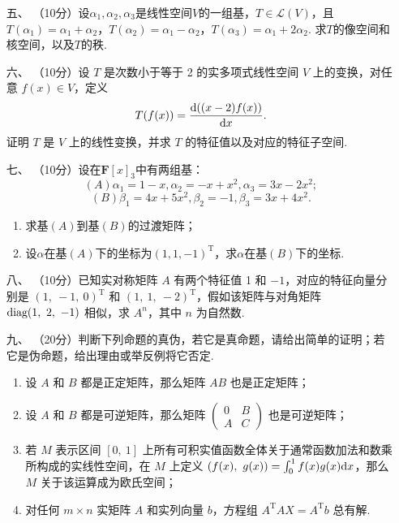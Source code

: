 \begin{enumerate}
	\item[五、]（10分）设$\alpha_1,\alpha_2,\alpha_3$是线性空间$V$的一组基，$T\in\mathcal{L}(V)$，且$T(\alpha_1)=\alpha_1+\alpha_2$，$T(\alpha_2)=\alpha_1-\alpha_2$，$T(\alpha_3)=\alpha_1+2\alpha_2$. 求$T$的像空间和核空间，以及$T$的秩.
	\item[六、]（10分）设 $T$ 是次数小于等于 2 的实多项式线性空间 $V$ 上的变换，对任意 $f(x) \in V$，定义
    \[T(f(x))=\frac{\textup{d}((x-2)f(x))}{\textup{d}x}.\]
    证明 $T$ 是 $V$ 上的线性变换，并求 $T$ 的特征值以及对应的特征子空间.
	\item[七、]（10分）设在$\mathbf{F}[x]_3$中有两组基：
	\[(A)\alpha_1=1-x,\alpha_2=-x+x^2,\alpha_3=3x-2x^2;\]
    \[(B)\beta_1=4x+5x^2,\beta_2=-1,\beta_3=3x+4x^2.\]
    \begin{enumerate}[label=(\arabic*)]
        \item 求基$(A)$到基$(B)$的过渡矩阵；

        \item 设$\alpha$在基$(A)$下的坐标为$(1,1,-1)^{\mathrm{T}}$，求$\alpha$在基$(B)$下的坐标.
    \end{enumerate}

\item[八、]（10分）已知实对称矩阵 $A$ 有两个特征值 1 和 $-1$，对应的特征向量分别是 $(1,\ -1,\ 0)^\mathrm{T}$ 和 $(1,\ 1,\ -2)^\mathrm{T}$，假如该矩阵与对角矩阵 $\textup{diag}(1,\ 2,\ -1)$ 相似，求 $A^n$，其中 $n$ 为自然数.
	\item[九、]（20分）判断下列命题的真伪，若它是真命题，请给出简单的证明；若它是伪命题，给出理由或举反例将它否定.
    \begin{enumerate}[label=(\arabic*)]
        \item 设 $A$ 和 $B$ 都是正定矩阵，那么矩阵 $AB$ 也是正定矩阵；

        \item 设 $A$ 和 $B$ 都是可逆矩阵，那么矩阵 $\begin{pmatrix}0 & B \\ A & C\end{pmatrix}$ 也是可逆矩阵；

        \item 若 $M$ 表示区间 $[0,\ 1]$ 上所有可积实值函数全体关于通常函数加法和数乘所构成的实线性空间，在 $M$ 上定义 $(f(x),\ g(x))=\int_0^1f(x)g(x)\textup{d}x$，那么 $M$ 关于该运算成为欧氏空间；

        \item 对任何 $m \times n$ 实矩阵 $A$ 和实列向量 $b$，方程组 $A^\mathrm{T}AX=A^\mathrm{T}b$ 总有解.
    \end{enumerate}
\end{enumerate}

\clearpage
